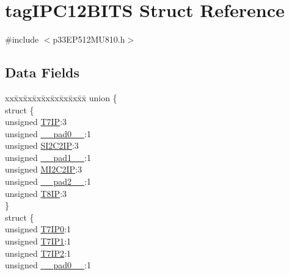 \hypertarget{structtag_i_p_c12_b_i_t_s}{}\section{tag\+I\+P\+C12\+B\+I\+TS Struct Reference}
\label{structtag_i_p_c12_b_i_t_s}


{\ttfamily \#include $<$p33\+E\+P512\+M\+U810.\+h$>$}

\subsection*{Data Fields}
\begin{DoxyCompactItemize}
\item 
\begin{tabbing}
xx\=xx\=xx\=xx\=xx\=xx\=xx\=xx\=xx\=\kill
union \{\\
\>struct \{\\
\>\>unsigned \hyperlink{structtag_i_p_c12_b_i_t_s_ab354526aa920f85a242a34a26c969ea2}{T7IP}:3\\
\>\>unsigned \hyperlink{structtag_i_p_c12_b_i_t_s_adf71f3d8410c1f1dbbc96680a92c49af}{\_\_pad0\_\_}:1\\
\>\>unsigned \hyperlink{structtag_i_p_c12_b_i_t_s_a22355406d9edf0f8f5a9078b52665529}{SI2C2IP}:3\\
\>\>unsigned \hyperlink{structtag_i_p_c12_b_i_t_s_acaf2d0924a107ec6e8d2e31febaf66f9}{\_\_pad1\_\_}:1\\
\>\>unsigned \hyperlink{structtag_i_p_c12_b_i_t_s_ac66b32bb234efdebcba8bc34e5ff2236}{MI2C2IP}:3\\
\>\>unsigned \hyperlink{structtag_i_p_c12_b_i_t_s_a4d97cc5f7d51d22fc2bf3eab35c9cb7f}{\_\_pad2\_\_}:1\\
\>\>unsigned \hyperlink{structtag_i_p_c12_b_i_t_s_abe76c2bd460cb5807d7611fd49e4d770}{T8IP}:3\\
\>\} \\
\>struct \{\\
\>\>unsigned \hyperlink{structtag_i_p_c12_b_i_t_s_a352fa7d7e103c8dbb920b8e85dea8082}{T7IP0}:1\\
\>\>unsigned \hyperlink{structtag_i_p_c12_b_i_t_s_a2f54786612901558ca1f6082efedd1bd}{T7IP1}:1\\
\>\>unsigned \hyperlink{structtag_i_p_c12_b_i_t_s_ad56e534b5291d350c345e67c508511e6}{T7IP2}:1\\
\>\>unsigned \hyperlink{structtag_i_p_c12_b_i_t_s_adf71f3d8410c1f1dbbc96680a92c49af}{\_\_pad0\_\_}:1\\

\end{tabbing}
\end{DoxyCompactItemize}
